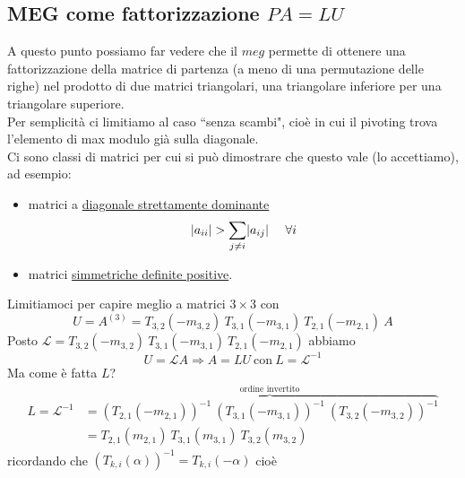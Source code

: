 \documentclass[12pt,a4paper]{article}
\DeclarePairedDelimiter{\abs}{\lvert}{\rvert}
\begin{document}
\subsection{MEG come fattorizzazione $PA=LU$}
A questo punto possiamo far vedere che il $meg$ permette di ottenere una fattorizzazione della matrice di partenza (a meno di una permutazione delle righe) nel prodotto di due matrici triangolari, una triangolare inferiore per una triangolare superiore.\\
Per semplicità ci limitiamo al caso ``senza scambi", cioè in cui il pivoting trova l'elemento di max modulo già sulla diagonale.\\
Ci sono classi di matrici per cui si può dimostrare che questo vale (lo accettiamo), ad esempio:
\begin{itemize}
    \item matrici a \uline{diagonale strettamente dominante}
    \[
        \abs{a_{ii}} > \sum_{j \neq i} \abs{a_{ij}} \  \  \  \ \forall i
    \]
    
    \item matrici \uline{simmetriche definite positive}. \end{itemize} Limitiamoci per capire meglio a matrici $3 \times 3$ con
    \[
    U = A^{(3)} = T_{3,2} (-m_{3,2}) \ T_{3,1} (-m_{3,1}) \ T_{2,1} (-m_{2,1}) \ A
    \]
    Posto $\mathcal{L} = T_{3,2} (-m_{3,2}) \ T_{3,1} (-m_{3,1}) \ T_{2,1} (-m_{2,1})$ abbiamo
    \[
    U = \mathcal{L}A \Rightarrow A = LU \ \text{con} \ L = \mathcal{L}^{-1}
    \]
    Ma come è fatta $L$?
    \[
    \begin{split}
        L = \mathcal{L}^{-1} & = \overbrace{(T_{2,1} (-m_{2,1}))^{-1} \ (T_{3,1} (-m_{3,1}))^{-1} \ (T_{3,2} (-m_{3,2}))^{-1}}^{\text{ordine invertito}} \\
        & = T_{2,1} (m_{2,1}) \ T_{3,1} (m_{3,1}) \ T_{3,2} (m_{3,2})
    \end{split}
    \]
    ricordando che $(T_{k,i} (\alpha))^{-1} = T_{k, i} (-\alpha)$ cioè
\end{document}
